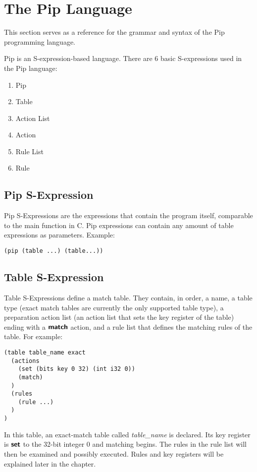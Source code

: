 \section{The Pip Language}
This section serves as a reference for the grammar and syntax of the Pip programming language.

Pip is an S-expression-based language. There are 6 basic S-expressions used in the Pip language:
\begin{enumerate}
  \item Pip
  \item Table
  \item Action List
  \item Action
  \item Rule List
  \item Rule
\end{enumerate}

\subsection{Pip S-Expression}
Pip S-Expressions are the expressions that contain the program itself, comparable to the main function in C. Pip expressions can contain any amount of table expressions as parameters. Example:
\begin{mdframed}
\begin{verbatim}
(pip (table ...) (table...))
\end{verbatim}
\end{mdframed}

\subsection{Table S-Expression}
Table S-Expressions define a match table. They contain, in order, a name, a table type (exact match tables are currently the only supported table type), a preparation action list (an action list that sets the key register of the table) ending with a $\bm{\mathsf{{match}}}$ action, and a rule list that defines the matching rules of the table. For example:
\begin{mdframed}
\begin{verbatim}
(table table_name exact
  (actions
    (set (bits key 0 32) (int i32 0))
    (match)
  )
  (rules
    (rule ...)
  )
)
\end{verbatim}
\end{mdframed}
In this table, an exact-match table called \textit{table\_name} is declared. Its key register is $\bm{\mathsf{{set}}}$ to the 32-bit integer 0 and matching begins. The rules in the rule list will then be examined and possibly executed. Rules and key registers will be explained later in the chapter.

